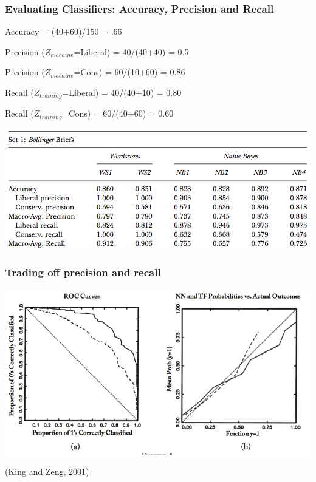 \documentclass[11pt,compress,professionalfonts]{beamer}
\begin{document}
\begin{frame}[t,fragile]\frametitle{Evaluating Classifiers: Accuracy, Precision and Recall}

\begin{center}
\end{center}

\vspace*{0.5cm}

Accuracy = (40+60)/150 = .66

Precision ($Z_{machine}$=Liberal) = 40/(40+40) = 0.5

Precision ($Z_{machine}$=Cons) = 60/(10+60) = 0.86

Recall ($Z_{training}$=Liberal) = 40/(40+10) = 0.80

Recall ($Z_{training}$=Cons) = 60/(40+60) = 0.60

\newpage

\centerline{\includegraphics[scale=.9]{pictures/bolinger}}

\end{frame}
\begin{frame}[t,fragile]\frametitle{Trading off precision and recall}


\centerline{\includegraphics[scale=.4]{pictures/roc-curves}}

(King and Zeng, 2001)

\end{frame}
\end{document}
